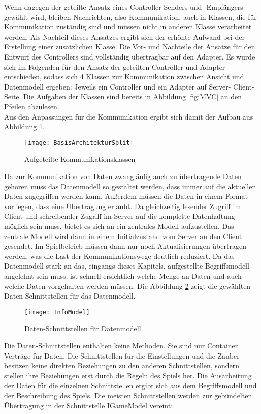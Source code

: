 Wenn dagegen der geteilte Ansatz eines Controller-Senders und -Empfängers gewählt wird, bleiben Nachrichten, also Kommunikation, auch in Klassen, die für Kommunikation zuständig sind und müssen nicht in anderen Klasse verarbeitet werden. Als Nachteil dieses Ansatzes ergibt sich der erhöhte Aufwand bei der Erstellung einer zusätzlichen Klasse. Die Vor- und Nachteile der Ansätze für den Entwurf des Controllers sind vollständig übertragbar auf den Adapter. Es wurde sich im Folgenden für den Ansatz der geteilten Controller und Adapter entschieden, sodass sich 4 Klassen zur Kommunikation zwischen Ansicht und Datenmodell ergeben: Jeweils ein Controller und ein Adapter auf Server- \bzw
Client-Seite. Die Aufgaben der Klassen sind bereits in Abbildung \ref{fig:MVC} an den Pfeilen abzulesen.\\
Aus den Anpassungen für die Kommunikation ergibt sich damit der Aufbau aus Abbildung \ref{fig:ArchitekturSplit}.
\begin{figure}[htp]
	\centering
	\captionsetup{justification=centering}
	\texttt{[image: BasisArchitekturSplit]}
	\caption[ArchitekturSplit]{Aufgeteilte Kommunikationsklassen}
	\label{fig:ArchitekturSplit}
\end{figure}

\noindent Da zur Kommunikation von Daten zwangläufig auch zu übertragende Daten gehören muss das Datenmodell so gestaltet werden, dass immer auf die aktuellen Daten zugegriffen werden kann. Außerdem müssen die Daten in einem Format vorliegen, dass eine Übertragung erlaubt. Da gleichzeitig lesender Zugriff im Client und schreibender Zugriff im Server auf die komplette Datenhaltung möglich sein muss, bietet es sich an ein zentrales Modell aufzustellen. Das zentrale Modell wird dann in einem Initialzustand vom Server an den Client gesendet. Im Spielbetrieb müssen dann nur noch Aktualisierungen übertragen werden, was die Last der Kommunikationswege deutlich reduziert. Da das Datenmodell stark an das, eingangs dieses Kapitels, aufgestellte Begriffsmodell angelehnt sein muss, ist schnell ersichtlich welche Menge an Daten und auch welche Daten vorgehalten werden müssen.
Die Abbildung \ref{fig:InfoModel} zeigt die gewählten Daten-Schnittstellen für das Datenmodell. 
\begin{figure}[htp]
	\centering
	\captionsetup{justification=centering}
	\texttt{[image: InfoModel]}
	\caption[InfoModel]{Daten-Schnittstellen für Datenmodell}
	\label{fig:InfoModel}
\end{figure}
\clearpage
\noindent Die Daten-Schnittstellen enthalten keine Methoden. Sie sind nur Container \bzw Verträge für Daten. Die Schnittstellen für die Einstellungen und die Zauber besitzen keine direkten Beziehungen zu den anderen Schnittstellen, sondern stellen ihre Beziehungen erst durch die Regeln des Spiels her. Die Ausarbeitung der Daten für die einzelnen Schnittstellen ergibt sich aus dem Begriffsmodell und der Beschreibung des Spiels. Die meisten Schnittstellen werden zur gebündelten Übertragung in der Schnittstelle IGameModel vereint:


